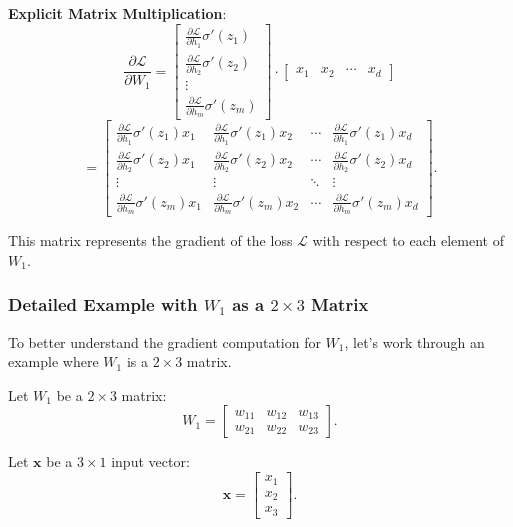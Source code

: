\begin{notechapter}
\textbf{Explicit Matrix Multiplication}:
\[
\frac{\partial \mathcal{L}}{\partial W_1} = \begin{bmatrix} \frac{\partial \mathcal{L}}{\partial h_1} \sigma'(z_1) \\ \frac{\partial \mathcal{L}}{\partial h_2} \sigma'(z_2) \\ \vdots \\ \frac{\partial \mathcal{L}}{\partial h_m} \sigma'(z_m) \end{bmatrix} \cdot \begin{bmatrix} x_1 & x_2 & \cdots & x_d \end{bmatrix}
\]
\[
= \begin{bmatrix}
\frac{\partial \mathcal{L}}{\partial h_1} \sigma'(z_1) x_1 & \frac{\partial \mathcal{L}}{\partial h_1} \sigma'(z_1) x_2 & \cdots & \frac{\partial \mathcal{L}}{\partial h_1} \sigma'(z_1) x_d \\
\frac{\partial \mathcal{L}}{\partial h_2} \sigma'(z_2) x_1 & \frac{\partial \mathcal{L}}{\partial h_2} \sigma'(z_2) x_2 & \cdots & \frac{\partial \mathcal{L}}{\partial h_2} \sigma'(z_2) x_d \\
\vdots & \vdots & \ddots & \vdots \\
\frac{\partial \mathcal{L}}{\partial h_m} \sigma'(z_m) x_1 & \frac{\partial \mathcal{L}}{\partial h_m} \sigma'(z_m) x_2 & \cdots & \frac{\partial \mathcal{L}}{\partial h_m} \sigma'(z_m) x_d
\end{bmatrix}.
\]

This matrix represents the gradient of the loss \( \mathcal{L} \) with respect to each element of \( W_1 \).

\subsubsection{Detailed Example with \( W_1 \) as a \( 2 \times 3 \) Matrix}
To better understand the gradient computation for \( W_1 \), let's work through an example where \( W_1 \) is a \( 2 \times 3 \) matrix.

Let \( W_1 \) be a \( 2 \times 3 \) matrix:
\[
W_1 = \begin{bmatrix}
w_{11} & w_{12} & w_{13} \\
w_{21} & w_{22} & w_{23}
\end{bmatrix}.
\]

Let \( \mathbf{x} \) be a \( 3 \times 1 \) input vector:
\[
\mathbf{x} = \begin{bmatrix}
x_1 \\
x_2 \\
x_3
\end{bmatrix}.
\]


\end{notechapter}
